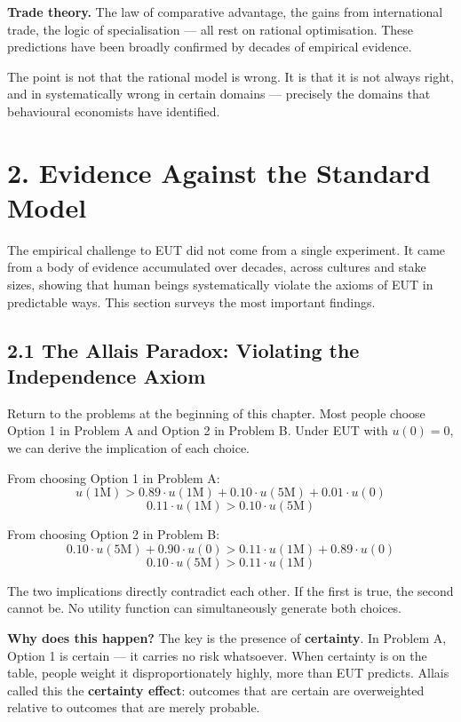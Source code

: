 \documentclass[12pt, letterpaper]{article}
\begin{document}
\textbf{Trade theory.} The law of comparative advantage, the gains from international trade, the logic of specialisation --- all rest on rational optimisation. These predictions have been broadly confirmed by decades of empirical evidence.

The point is not that the rational model is wrong. It is that it is not always right, and in systematically wrong in certain domains --- precisely the domains that behavioural economists have identified.

\medskip


\section{2. Evidence Against the Standard Model}


The empirical challenge to EUT did not come from a single experiment. It came from a body of evidence accumulated over decades, across cultures and stake sizes, showing that human beings systematically violate the axioms of EUT in predictable ways. This section surveys the most important findings.


\subsection{2.1 The Allais Paradox: Violating the Independence Axiom}


Return to the problems at the beginning of this chapter. Most people choose Option 1 in Problem A and Option 2 in Problem B. Under EUT with $u(0) = 0$, we can derive the implication of each choice.

From choosing Option 1 in Problem A: $$u(1\text{M}) > 0.89 \cdot u(1\text{M}) + 0.10 \cdot u(5\text{M}) + 0.01 \cdot u(0)$$ $$0.11 \cdot u(1\text{M}) > 0.10 \cdot u(5\text{M})$$

From choosing Option 2 in Problem B: $$0.10 \cdot u(5\text{M}) + 0.90 \cdot u(0) > 0.11 \cdot u(1\text{M}) + 0.89 \cdot u(0)$$ $$0.10 \cdot u(5\text{M}) > 0.11 \cdot u(1\text{M})$$

The two implications directly contradict each other. If the first is true, the second cannot be. No utility function can simultaneously generate both choices.

\textbf{Why does this happen?} The key is the presence of \textbf{certainty}. In Problem A, Option 1 is certain --- it carries no risk whatsoever. When certainty is on the table, people weight it disproportionately highly, more than EUT predicts. Allais called this the \textbf{certainty effect}: outcomes that are certain are overweighted relative to outcomes that are merely probable.
\end{document}
